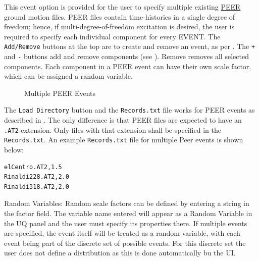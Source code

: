This event option is provided for the user to specify multiple existing
\href{http://peer.berkeley.edu}{PEER} ground
motion files. PEER files contain time-histories in a single degree of freedom; hence, if multi-degree-of-freedom excitation is desired, the user is required to specify each
individual component for every EVENT. The \texttt{Add/Remove} buttons
at the top are to create and remove an event, as
per . The \texttt{+} and \texttt{-} buttons add and remove
components (see ). Remove removes all selected components. Each
component in a PEER event can have their own scale factor, which can be assigned a random variable.

\begin{figure}[!htbp]
  \caption{Multiple PEER Events}
  \label{fig:PEER_event_panel}
\end{figure}

The \texttt{Load Directory} button and the \texttt{Records.txt} file works for PEER events as described in . The only difference is that PEER files are expected to have an \texttt{.AT2} extension. Only files with that extension shall be specified in the \texttt{Records.txt}.
An example \texttt{Records.txt} file for multiple Peer
events is shown below:

\begin{verbatim}
elCentro.AT2,1.5
Rinaldi228.AT2,2.0
Rinaldi318.AT2,2.0
\end{verbatim}

Random Variables: Random scale factors can be defined by entering a string in the factor field. The variable name entered will appear as a Random Variable in the UQ panel and the user must specify its properties there. If multiple
events are specified, the event itself will be treated as a random
variable, with each event being part of the discrete set of possible
events. For this discrete set the user does not define a distribution as this is done automatically bu the UI.
